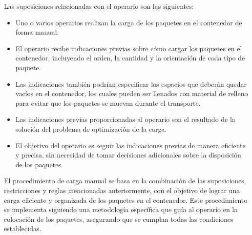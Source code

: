 Las suposiciones relacionadas con el operario son las siguientes:

\begin{itemize}
    \item Uno o varios operarios realizan la carga de los paquetes en el contenedor de forma manual.
    \item El operario recibe indicaciones previas sobre cómo cargar los paquetes en el contenedor, incluyendo el orden, la cantidad y la orientación de cada tipo de paquete.
    \item Las indicaciones también podrían especificar los espacios que deberán quedar vacíos en el contenedor, los cuales pueden ser llenados con material de relleno para evitar que los paquetes se muevan durante el transporte.
    \item Las indicaciones previas proporcionadas al operario son el resultado de la solución del problema de optimización de la carga.
    \item El objetivo del operario es seguir las indicaciones previas de manera eficiente y precisa, sin necesidad de tomar decisiones adicionales sobre la disposición de los paquetes.
\end{itemize}

El procedimiento de carga manual se basa en la combinación de las suposiciones, restricciones y reglas mencionadas anteriormente, con el objetivo de lograr una carga eficiente y organizada de los paquetes en el contenedor. Este procedimiento se implementa siguiendo una metodología específica que guía al operario en la colocación de los paquetes, asegurando que se cumplan todas las condiciones establecidas.
